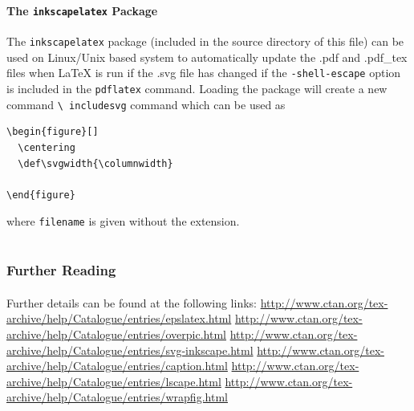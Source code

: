 \documentclass[article]{beamer}
\begin{document}
\begin{frame}[fragile]
  \frametitle{\thesubsection}
  \framesubtitle{The \texttt{inkscapelatex} Package}
  The \texttt{inkscapelatex} package (included in the source directory of this
  file) can be used on Linux/Unix based system to automatically update the .pdf and
  .pdf\_tex files when \LaTeX{} is run if the .svg file has changed if the
  \texttt{-shell-escape} option is included in the \texttt{pdflatex} command.
  Loading the package  will create a new command \texttt{\textbackslash
  includesvg} command which can be used as
  \begin{verbatim}
\begin{figure}[]
  \centering
  \def\svgwidth{\columnwidth}
  
\end{figure}
  \end{verbatim}
  where \texttt{filename} is given without the extension.
\end{frame}

\section*{}
\begin{frame}
  \frametitle{Further Reading}
  \framesubtitle{}
  Further details can be found at the following links:
  \scriptsize
  \url{http://www.ctan.org/tex-archive/help/Catalogue/entries/epslatex.html}
  \url{http://www.ctan.org/tex-archive/help/Catalogue/entries/overpic.html}
  \url{http://www.ctan.org/tex-archive/help/Catalogue/entries/svg-inkscape.html}
  \url{http://www.ctan.org/tex-archive/help/Catalogue/entries/caption.html}
  \url{http://www.ctan.org/tex-archive/help/Catalogue/entries/lscape.html}
  \url{http://www.ctan.org/tex-archive/help/Catalogue/entries/wrapfig.html}
\end{frame}
\end{document}
